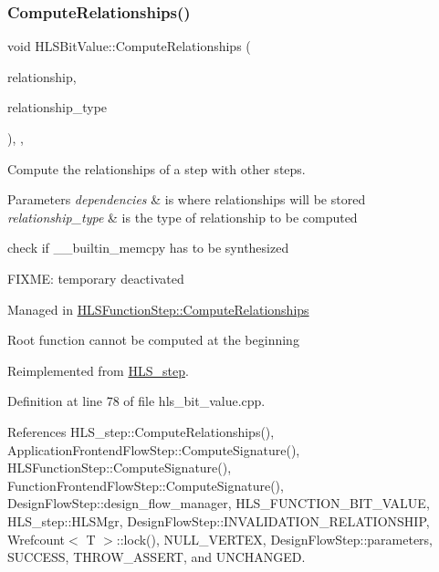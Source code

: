 \mbox{\label{classHLSBitValue_ab1fe55bc2b8b26bd131e9aed874f5e94}} 
\subsubsection{\texorpdfstring{Compute\+Relationships()}{ComputeRelationships()}}
{\footnotesize\ttfamily void H\+L\+S\+Bit\+Value\+::\+Compute\+Relationships (\begin{DoxyParamCaption}\item[{\hyperlink{classDesignFlowStepSet}{Design\+Flow\+Step\+Set} \&}]{relationship,  }\item[{const \hyperlink{classDesignFlowStep_a723a3baf19ff2ceb77bc13e099d0b1b7}{Design\+Flow\+Step\+::\+Relationship\+Type}}]{relationship\+\_\+type }\end{DoxyParamCaption})\hspace{0.3cm}{\ttfamily [override]}, {\ttfamily [private]}, {\ttfamily [virtual]}}



Compute the relationships of a step with other steps. 


\begin{DoxyParams}{Parameters}
{\em dependencies} & is where relationships will be stored \\
\hline
{\em relationship\+\_\+type} & is the type of relationship to be computed \\
\hline
\end{DoxyParams}
check if \+\_\+\+\_\+builtin\+\_\+memcpy has to be synthesized

F\+I\+X\+ME\+: temporary deactivated

Managed in \hyperlink{classHLSFunctionStep_ab3864e8dbd73b0eabc25f386a0cece54}{H\+L\+S\+Function\+Step\+::\+Compute\+Relationships}

Root function cannot be computed at the beginning 

Reimplemented from \hyperlink{classHLS__step_ad5c58777d9b466fb3eee185f6d3ac993}{H\+L\+S\+\_\+step}.



Definition at line 78 of file hls\+\_\+bit\+\_\+value.\+cpp.



References H\+L\+S\+\_\+step\+::\+Compute\+Relationships(), Application\+Frontend\+Flow\+Step\+::\+Compute\+Signature(), H\+L\+S\+Function\+Step\+::\+Compute\+Signature(), Function\+Frontend\+Flow\+Step\+::\+Compute\+Signature(), Design\+Flow\+Step\+::design\+\_\+flow\+\_\+manager, H\+L\+S\+\_\+\+F\+U\+N\+C\+T\+I\+O\+N\+\_\+\+B\+I\+T\+\_\+\+V\+A\+L\+UE, H\+L\+S\+\_\+step\+::\+H\+L\+S\+Mgr, Design\+Flow\+Step\+::\+I\+N\+V\+A\+L\+I\+D\+A\+T\+I\+O\+N\+\_\+\+R\+E\+L\+A\+T\+I\+O\+N\+S\+H\+IP, Wrefcount$<$ T $>$\+::lock(), N\+U\+L\+L\+\_\+\+V\+E\+R\+T\+EX, Design\+Flow\+Step\+::parameters, S\+U\+C\+C\+E\+SS, T\+H\+R\+O\+W\+\_\+\+A\+S\+S\+E\+RT, and U\+N\+C\+H\+A\+N\+G\+ED.

